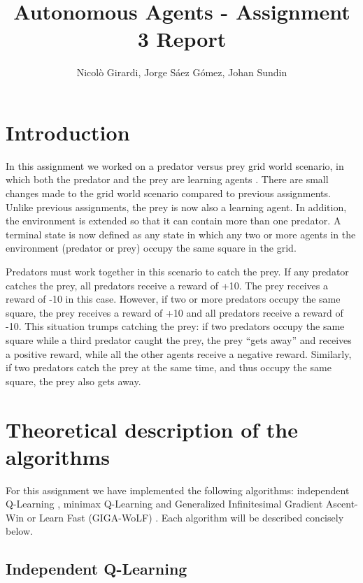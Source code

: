 \documentclass[a4paper,12pt]{article}
\title{Autonomous Agents - Assignment 3 Report}
\author{Nicolò Girardi, Jorge Sáez Gómez, Johan Sundin}
\begin{document}
\maketitle

\section{Introduction}

In this assignment we worked on a predator versus prey grid world scenario, in which both the predator and the prey are learning agents \cite{Assignment}. There are small changes made to the grid world scenario compared to previous assignments. Unlike previous assignments, the prey is now also a learning agent. In addition, the environment is extended so that it can contain more than one predator. A terminal state is now defined as any state in which any two or more agents in the environment (predator or prey) occupy the same square in the grid.

Predators must work together in this scenario to catch the prey. If any predator catches the prey, all predators receive a reward of +10. The prey receives a reward of -10 in this case. However, if two or more predators occupy the same square, the prey receives a reward of +10 and all predators receive a reward of -10. This situation trumps catching the prey: if two predators occupy the same square while a third predator caught the prey, the prey ``gets away'' and receives a positive reward, while all the other agents receive a negative reward. Similarly, if two predators catch the prey at the same time, and thus occupy the same square, the prey also gets away.

\section{Theoretical description of the algorithms}

For this assignment we have implemented the following algorithms: independent Q-Learning \cite{vlasis}, minimax Q-Learning \cite{minimax} and Generalized Infinitesimal Gradient Ascent-Win or Learn Fast (GIGA-WoLF) \cite{GIGA-wolf}. Each algorithm will be described concisely below.

\subsection{Independent Q-Learning}
\end{document}
